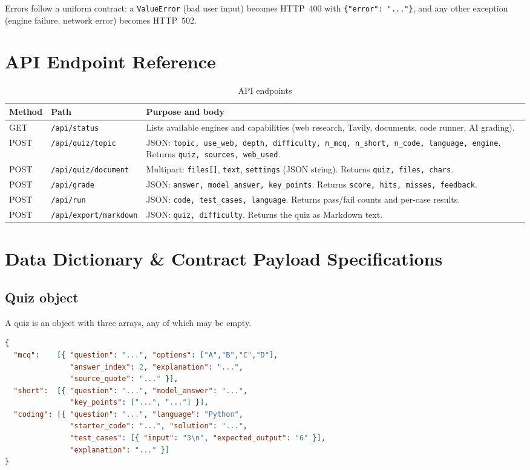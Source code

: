 Errors follow a uniform contract: a \texttt{ValueError} (bad user input) becomes HTTP~400 with \texttt{\{"error": "..."\}}, and any other exception (engine failure, network error) becomes HTTP~502.

\section{API Endpoint Reference}
\begin{table}[H]
\centering
\begin{tabularx}{\textwidth}{@{} p{1.6cm} p{4.6cm} X @{}}
\toprule
\textbf{Method} & \textbf{Path} & \textbf{Purpose and body} \\
\midrule
GET  & \texttt{/api/status} & Lists available engines and capabilities (web research, Tavily, documents, code runner, AI grading). \\
POST & \texttt{/api/quiz/topic} & JSON: \texttt{topic, use\_web, depth, difficulty, n\_mcq, n\_short, n\_code, language, engine}. Returns \texttt{quiz, sources, web\_used}. \\
POST & \texttt{/api/quiz/document} & Multipart: \texttt{files[]}, \texttt{text}, \texttt{settings} (JSON string). Returns \texttt{quiz, files, chars}. \\
POST & \texttt{/api/grade} & JSON: \texttt{answer, model\_answer, key\_points}. Returns \texttt{score, hits, misses, feedback}. \\
POST & \texttt{/api/run} & JSON: \texttt{code, test\_cases, language}. Returns pass/fail counts and per-case results. \\
POST & \texttt{/api/export/markdown} & JSON: \texttt{quiz, difficulty}. Returns the quiz as Markdown text. \\
\bottomrule
\end{tabularx}
\caption{API endpoints}
\label{tab:endpoints}
\end{table}

\section{Data Dictionary \& Contract Payload Specifications}
\subsection{Quiz object}
A quiz is an object with three arrays, any of which may be empty.
\begin{lstlisting}[language=JSON, caption={Quiz payload returned by the generation endpoints}, label={lst:quiz-json}]
{
  "mcq":    [{ "question": "...", "options": ["A","B","C","D"],
               "answer_index": 2, "explanation": "...",
               "source_quote": "..." }],
  "short":  [{ "question": "...", "model_answer": "...",
               "key_points": ["...", "..."] }],
  "coding": [{ "question": "...", "language": "Python",
               "starter_code": "...", "solution": "...",
               "test_cases": [{ "input": "3\n", "expected_output": "6" }],
               "explanation": "..." }]
}
\end{lstlisting}

